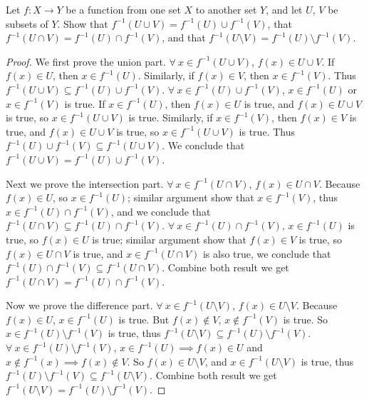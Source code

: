\begin{exercise}\label{ex 3.4.4}
Let \(f : X \to Y\) be a function from one set \(X\) to another set \(Y\), and let \(U\), \(V\) be subsets of \(Y\). Show that \(f^{-1}(U \cup V) = f^{-1}(U) \cup f^{-1}(V)\), that
\(f^{-1}(U \cap V) = f^{-1}(U) \cap f^{-1}(V)\), and that \(f^{-1}(U \setminus V) = f^{-1}(U) \setminus f^{-1}(V)\).
\end{exercise}

\begin{proof}
We first prove the union part.
\(\forall\ x \in f^{-1}(U \cup V)\), \(f(x) \in U \cup V\).
If \(f(x) \in U\), then \(x \in f^{-1}(U)\).
Similarly, if \(f(x) \in V\), then \(x \in f^{-1}(V)\).
Thus \(f^{-1}(U \cup V) \subseteq f^{-1}(U) \cup f^{-1}(V)\).
\(\forall\ x \in f^{-1}(U) \cup f^{-1}(V)\), \(x \in f^{-1}(U)\) or \(x \in f^{-1}(V)\) is true.
If \(x \in f^{-1}(U)\), then \(f(x) \in U\) is true, and \(f(x) \in U \cup V\) is true, so \(x \in f^{-1}(U \cup V)\) is true.
Similarly, if \(x \in f^{-1}(V)\), then \(f(x) \in V\) is true, and \(f(x) \in U \cup V\) is true, so \(x \in f^{-1}(U \cup V)\) is true.
Thus \(f^{-1}(U) \cup f^{-1}(V) \subseteq f^{-1}(U \cup V)\).
We conclude that \(f^{-1}(U \cup V) = f^{-1}(U) \cup f^{-1}(V)\).

Next we prove the intersection part.
\(\forall\ x \in f^{-1}(U \cap V)\), \(f(x) \in U \cap V\).
Because \(f(x) \in U\), so \(x \in f^{-1}(U)\);
similar argument show that \(x \in f^{-1}(V)\), thus \(x \in f^{-1}(U) \cap f^{-1}(V)\), and we conclude that \(f^{-1}(U \cap V) \subseteq f^{-1}(U) \cap f^{-1}(V)\).
\(\forall\ x \in f^{-1}(U) \cap f^{-1}(V)\), \(x \in f^{-1}(U)\) is true, so \(f(x) \in U\) is true;
similar argument show that \(f(x) \in V\) is true, so \(f(x) \in U \cap V\) is true, and \(x \in f^{-1}(U \cap V)\) is also true, we conclude that \(f^{-1}(U) \cap f^{-1}(V) \subseteq f^{-1}(U \cap V)\).
Combine both result we get \(f^{-1}(U \cap V) = f^{-1}(U) \cap f^{-1}(V)\).

Now we prove the difference part.
\(\forall\ x \in f^{-1}(U \setminus V)\), \(f(x) \in U \setminus V\).
Because \(f(x) \in U\), \(x \in f^{-1}(U)\) is true.
But \(f(x) \notin V\), \(x \notin f^{-1}(V)\) is true.
So \(x \in f^{-1}(U) \setminus f^{-1}(V)\) is true, thus \(f^{-1}(U \setminus V) \subseteq f^{-1}(U) \setminus f^{-1}(V)\).
\(\forall\ x \in f^{-1}(U) \setminus f^{-1}(V)\), \(x \in f^{-1}(U) \implies f(x) \in U\) and \(x \notin f^{-1}(x) \implies f(x) \notin V\).
So \(f(x) \in U \setminus V\), and \(x \in f^{-1}(U \setminus V)\) is true, thus \( f^{-1}(U) \setminus f^{-1}(V) \subseteq f^{-1}(U \setminus V)\).
Combine both result we get \(f^{-1}(U \setminus V) = f^{-1}(U) \setminus f^{-1}(V)\).
\end{proof}

